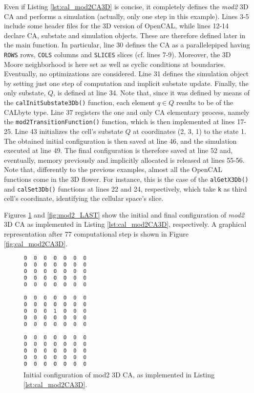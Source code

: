 Even if Listing \ref{lst:cal_mod2CA3D} is concise, it
completely defines the \emph{mod2} 3D CA and performs a simulation
(actually, only one step in this example). Lines 3-5 include some
header files for the 3D version of OpenCAL, while lines 12-14 declare
CA, substate and simulation objects. These are therefore defined later
in the main function. In particular, line 30 defines the CA as a
parallelepiped having \verb'ROWS' rows, \verb'COLS' columns and
\verb'SLICES' slices (cf. lines 7-9). Moreover, the 3D Moore
neighborhood is here set as well as cyclic conditions at
boundaries. Eventually, no optimizations are considered. Line 31
defines the simulation object by setting just one step of computation
and implicit substate update. Finally, the only substate, $Q$, is
defined at line 34. Note that, since it was defined by means of the
\verb'calInitSubstate3Db()' function, each element $q \in Q$ results
to be of the CALbyte type. Line 37 registers the one and only CA elementary
process, namely the \verb'mod2TransitionFunction()' function, which
is then implemented at lines 17-25. Line 43 initializes the cell's
substate $Q$ at coordinates (2, 3, 1) to the state 1. The obtained
initial configuration is then saved at line 46, and the
simulation executed at line 49. The final configuration is therefore saved
at line 52 and, eventually, memory previously and implicitly
allocated is released at lines 55-56. Note that, differently to the
previous examples, almost all the OpenCAL functions come in the 3D
flower. For instance, this is the case of the \verb'alGetX3Db()' and
\verb'calSet3Db()' functions at lines 22 and 24, respectively, which
take \verb'k' as third cell's coordinate, identifying the cellular
space's slice.

Figures \ref{fig:mod2_0000} and \ref{fig:mod2_LAST} show the initial
and final configuration of \emph{mod2} 3D CA as implemented in Listing
\ref{lst:cal_mod2CA3D}, respectively. A graphical representation after
77 computational step is shown in Figure \ref{fig:cal_mod2CA3D}.

\begin{figure}
  \begin{center}
    \includegraphics[width=3.5cm]{./images/OpenCAL/mod2_0000}
    \caption{Initial configuration of mod2 3D CA, as implemented in Listing \ref{lst:cal_mod2CA3D}.}
    \label{fig:mod2_0000}
  \end{center}
\end{figure}

